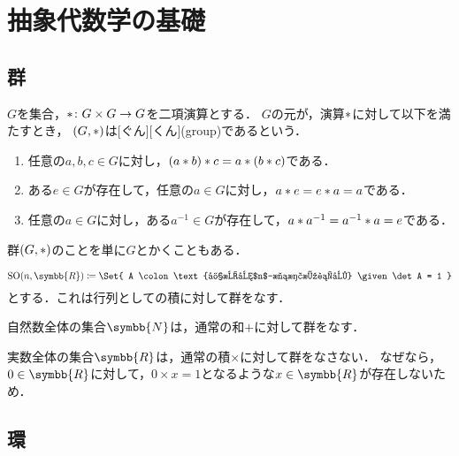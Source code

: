 \documentclass[../sotsu.tex]{subfiles}
\begin{document}
\section{抽象代数学の基礎}

\subsection{群}

\begin{definition}[群]
    \label{dfn:group}
    $G$を集合，$\mathbin{\ast} \colon G \times G \to G$を二項演算とする．
    $G$の元が，演算$\mathbin{\ast}$に対して以下を満たすとき，
    $(G, \mathbin{\ast})$は[ぐん][くん](group)であるという．
    \begin{enumerate}
        \item 任意の$a, b, c \in G$に対し，$(a \mathbin{\ast} b) \mathbin{\ast} c = a \mathbin{\ast} (b \mathbin{\ast} c)$である．
        \item ある$e \in G$が存在して，任意の$a \in G$に対し，$a \mathbin{\ast} e = e \mathbin{\ast} a = a$である．
        \item 任意の$a \in G$に対し，ある$a^{-1} \in G$が存在して，$a \mathbin{\ast} a^{-1} = a^{-1} \mathbin{\ast} a = e$である．
    \end{enumerate}
    群$(G, \mathbin{\ast})$のことを単に$G$とかくこともある．
\end{definition}

\begin{example}
    \begin{equation*}
        \mathrm{SO}(n, \symbb{R}) \coloneq \Set{ A \colon \text{実成分$n$-次正方行列} \given \det A = 1 }
    \end{equation*}
    とする．これは行列としての積に対して群をなす．
\end{example}

\begin{example}
    自然数全体の集合$\symbb{N}$は，通常の和$+$に対して群をなす．
\end{example}

\begin{example}
    実数全体の集合$\symbb{R}$は，通常の積$\times$に対して群をなさない．
    なぜなら，$0 \in \symbb{R}$に対して，$0 \times x = 1$となるような$x \in \symbb{R}$が存在しないため．
\end{example}


\subsection{環}
\end{document}
